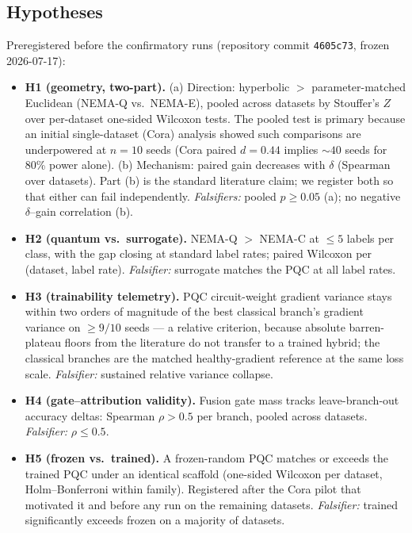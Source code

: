 \documentclass[pdflatex,sn-mathphys-num]{sn-jnl}
\begin{document}
\subsection{Hypotheses}\label{sec:hypotheses}

Preregistered before the confirmatory runs (repository commit \texttt{4605c73}, frozen 2026-07-17):

\begin{itemize}
\item \textbf{H1 (geometry, two-part).} (a) Direction: hyperbolic $>$ parameter-matched Euclidean (NEMA-Q vs.\ NEMA-E), pooled across datasets by Stouffer's $Z$ over per-dataset one-sided Wilcoxon tests. The pooled test is primary because an initial single-dataset (Cora) analysis showed such comparisons are underpowered at $n=10$ seeds (Cora paired $d=0.44$ implies ${\sim}40$ seeds for 80\% power alone). (b) Mechanism: paired gain decreases with $\delta$ (Spearman over datasets). Part (b) is the standard literature claim; we register both so that either can fail independently. \emph{Falsifiers:} pooled $p \ge 0.05$ (a); no negative $\delta$--gain correlation (b).
\item \textbf{H2 (quantum vs.\ surrogate).} NEMA-Q $>$ NEMA-C at $\le 5$ labels per class, with the gap closing at standard label rates; paired Wilcoxon per (dataset, label rate). \emph{Falsifier:} surrogate matches the PQC at all label rates.
\item \textbf{H3 (trainability telemetry).} PQC circuit-weight gradient variance stays within two orders of magnitude of the best classical branch's gradient variance on $\ge 9/10$ seeds --- a relative criterion, because absolute barren-plateau floors from the literature do not transfer to a trained hybrid; the classical branches are the matched healthy-gradient reference at the same loss scale. \emph{Falsifier:} sustained relative variance collapse.
\item \textbf{H4 (gate--attribution validity).} Fusion gate mass tracks leave-branch-out accuracy deltas: Spearman $\rho > 0.5$ per branch, pooled across datasets. \emph{Falsifier:} $\rho \le 0.5$.
\item \textbf{H5 (frozen vs.\ trained).} A frozen-random PQC matches or exceeds the trained PQC under an identical scaffold (one-sided Wilcoxon per dataset, Holm--Bonferroni within family). Registered after the Cora pilot that motivated it and before any run on the remaining datasets. \emph{Falsifier:} trained significantly exceeds frozen on a majority of datasets.
\end{itemize}
\end{document}
